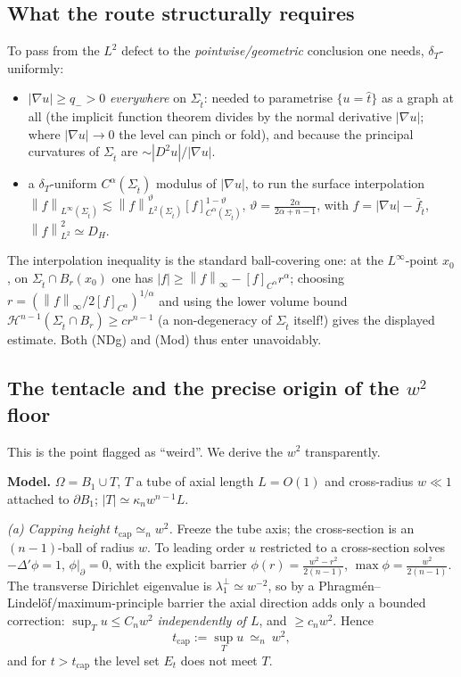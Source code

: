 \documentclass[11pt]{amsart}
\theoremstyle{definition}
\theoremstyle{remark}
\newcommand{\Om}{\Omega}
\newcommand{\St}{\Sigma_{\hat t}}
\newcommand{\dT}{\delta_T}
\newcommand{\Hess}{D^2u}
\newcommand{\Hn}{\mathcal H^{n-1}}
\newcommand{\norm}[1]{\left\lVert#1\right\rVert}
\begin{document}
\subsection{What the route structurally requires}
To pass from the $L^2$ defect to the \emph{pointwise/geometric} conclusion one
needs, $\dT$-uniformly:
\begin{itemize}
\item[\textbf{(NDg)}] $|\nabla u|\ge q_->0$ \emph{everywhere} on $\St$: needed
to parametrise $\{u=\hat t\}$ as a graph at all (the implicit function theorem
divides by the normal derivative $|\nabla u|$; where $|\nabla u|\to0$ the level
can pinch or fold), and because the principal curvatures of $\St$ are
$\sim|\Hess|/|\nabla u|$.
\item[\textbf{(Mod)}] a $\dT$-uniform $C^\alpha(\St)$ modulus of $|\nabla u|$,
to run the surface interpolation
$\norm{f}_{L^\infty(\St)}\lesssim\norm{f}_{L^2(\St)}^{\vartheta}[f]_{C^\alpha(\St)}^{1-\vartheta}$,
$\vartheta=\tfrac{2\alpha}{2\alpha+n-1}$, with $f=|\nabla u|-\bar f_{\hat t}$,
$\norm{f}_{L^2}^2\simeq D_H$.
\end{itemize}
The interpolation inequality is the standard ball-covering one: at the
$L^\infty$-point $x_0$, on $\St\cap B_r(x_0)$ one has
$|f|\ge\norm f_\infty-[f]_{C^\alpha}r^\alpha$; choosing
$r=(\norm f_\infty/2[f]_{C^\alpha})^{1/\alpha}$ and using the lower volume
bound $\Hn(\St\cap B_r)\ge c r^{n-1}$ (a non-degeneracy of $\St$ itself!) gives
the displayed estimate. Both (NDg) and (Mod) thus enter unavoidably.

\subsection{The tentacle and the precise origin of the $w^2$ floor}
\label{ss:tent}
This is the point flagged as ``weird''. We derive the $w^2$ transparently.

\textbf{Model.} $\Om=B_1\cup T$, $T$ a tube of axial length $L=O(1)$ and
cross-radius $w\ll1$ attached to $\partial B_1$; $|T|\simeq\kappa_n w^{n-1}L$.

\emph{(a) Capping height $t_{\mathrm{cap}}\simeq_n w^2$.}
Freeze the tube axis; the cross-section is an $(n-1)$-ball of radius $w$.
To leading order $u$ restricted to a cross-section solves
$-\Delta'\phi=1$, $\phi|_{\partial}=0$, with the explicit barrier
$\phi(r)=\tfrac{w^2-r^2}{2(n-1)}$, $\max\phi=\tfrac{w^2}{2(n-1)}$. The
transverse Dirichlet eigenvalue is $\lambda_1^\perp\simeq w^{-2}$, so by a
Phragm\'en--Lindel\"of/maximum-principle barrier the axial direction adds only
a bounded correction: $\sup_T u\le C_n w^2$ \emph{independently of $L$}, and
$\ge c_n w^2$. Hence
\[
  t_{\mathrm{cap}}:=\sup_T u\ \simeq_n\ w^2,
\]
and for $t>t_{\mathrm{cap}}$ the level set $E_t$ does not meet $T$.
\end{document}
